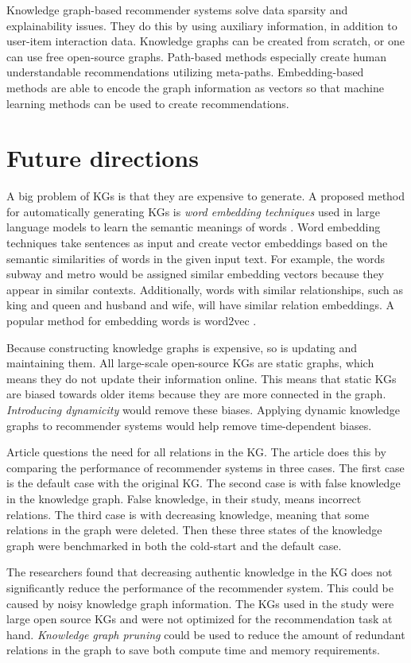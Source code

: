 \documentclass[english, 12pt, a4paper, sci, utf8, a-2b, online]{aaltothesis}
\begin{document}
Knowledge graph-based recommender systems solve data sparsity and explainability issues. They do this by using auxiliary information, in addition to user-item interaction data. Knowledge graphs can be created from scratch, or one can use free open-source graphs. Path-based methods especially create human understandable recommendations utilizing meta-paths. Embedding-based methods are able to encode the graph information as vectors so that machine learning methods can be used to create recommendations.

\section{Future directions}

A big problem of KGs is that they are expensive to generate. A proposed method for automatically generating KGs is \textit{word embedding techniques} used in large language models to learn the semantic meanings of words \parencite{hogan2021knowledge}. Word embedding techniques take sentences as input and create vector embeddings based on the semantic similarities of words in the given input text. For example, the words subway and metro would be assigned similar embedding vectors because they appear in similar contexts. Additionally, words with similar relationships, such as king and queen and husband and wife, will have similar relation embeddings. A popular method for embedding words is word2vec \parencite{mikolov2013efficient}.

Because constructing knowledge graphs is expensive, so is updating and maintaining them. All large-scale open-source KGs are static graphs, which means they do not update their information online. This means that static KGs are biased towards older items because they are more connected in the graph. \textit{Introducing dynamicity} would remove these biases. Applying dynamic knowledge graphs to recommender systems would help remove time-dependent biases. 

Article \parencite{zhang2024does} questions the need for all relations in the KG. The article does this by comparing the performance of recommender systems in three cases. The first case is the default case with the original KG. The second case is with false knowledge in the knowledge graph. False knowledge, in their study, means incorrect relations. The third case is with decreasing knowledge, meaning that some relations in the graph were deleted. Then these three states of the knowledge graph were benchmarked in both the cold-start and the default case. 

The researchers found that decreasing authentic knowledge in the KG does not significantly reduce the performance of the recommender system. This could be caused by noisy knowledge graph information. The KGs used in the study were large open source KGs and were not optimized for the recommendation task at hand. \textit{Knowledge graph pruning} could be used to reduce the amount of redundant relations in the graph to save both compute time and memory requirements.  


\clearpage

\printbibliography
\end{document}
